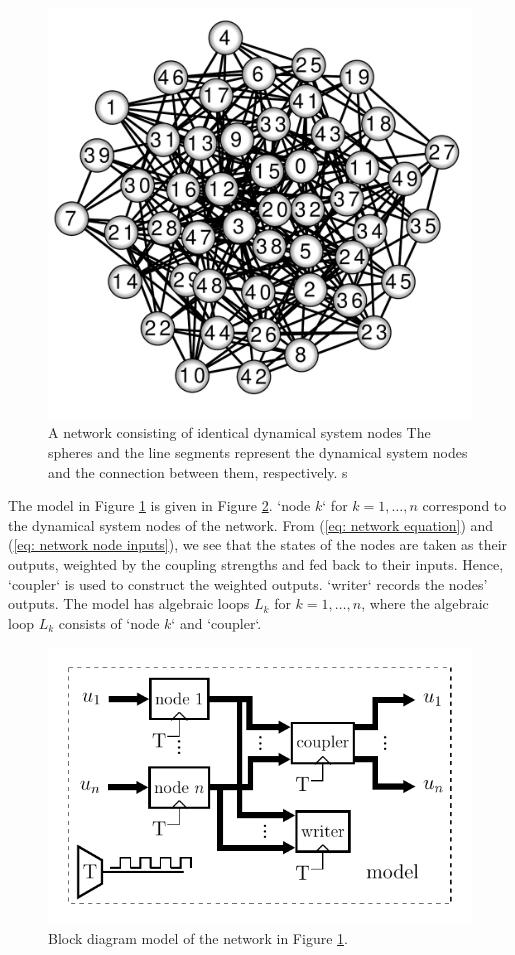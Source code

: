 \begin{figure}
    \centering
    \includegraphics[width=0.5\linewidth]{figures/Networks/wattz_strogatz.pdf}    
    \caption{A network consisting of identical dynamical system nodes The spheres and the line segments represent the dynamical system nodes and the connection between them, respectively. s}
    \label{fig: network graph}
\end{figure}

The model in Figure \ref{fig: network graph} is given in Figure \ref{fig: network model}. `node $k$` for $k =1, \ldots, n$ correspond to the dynamical system nodes of the network.  From (\ref{eq: network equation}) and (\ref{eq: network node inputs}), we see that the states of the nodes are taken as their outputs, weighted by the coupling strengths and fed back to their inputs. Hence, `coupler` is used to construct the weighted outputs. `writer` records the nodes' outputs. The model has algebraic loops $L_k$ for $k = 1, \ldots, n$, where the algebraic loop $L_k$ consists of `node $k$` and `coupler`. 

\begin{figure}
    \centering
    \includegraphics[width=0.8\linewidth]{figures/NetworkModel-WattzStrogatz/network_wattz_strogratz.pdf}
    \caption{Block diagram model of the network in Figure \ref{fig: network graph}.}
    \label{fig: network model}
\end{figure}

